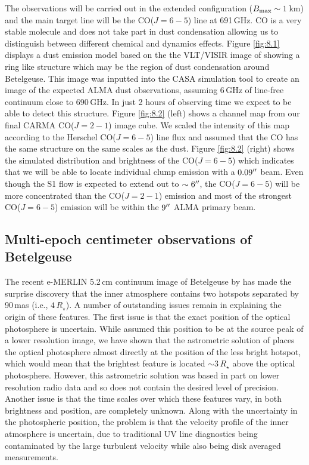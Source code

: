 The observations will be carried out in the extended configuration ($B_{\rm{max}} \sim 1\,$km) and the main target line will be the CO($J=6-5$) line at 691\,GHz. CO is a very stable molecule and does not take part in dust condensation allowing us to distinguish between different chemical and dynamics effects. Figure \ref{fig:8.1} displays a dust emission model based on the the VLT/VISIR image of \cite{kervella_2011} showing a ring like structure which may be the region of dust condensation around Betelgeuse. This image was inputted into the CASA simulation tool to create an image of the expected ALMA dust observations, assuming 6\,GHz of line-free continuum close to 690\,GHz. In just 2 hours of observing time we expect to be able to detect this structure. Figure \ref{fig:8.2} (left) shows a channel map from our final CARMA CO($J=2-1$) image cube. We scaled the intensity of this map according to the Herschel CO($J=6-5$)
line flux and assumed that the CO has the same structure on the same scales as the dust. Figure \ref{fig:8.2} (right) shows the simulated distribution and brightness of the CO($J=6-5$) which indicates that we will be able to locate individual clump emission with a $0.09^{\prime\prime}$ beam. Even though the S1 flow is expected to extend out to $\sim 6^{\prime\prime}$, the CO($J=6-5$) will be more concentrated than the CO($J=2-1$) emission and most of the strongest CO($J=6-5$) emission will be within the $9^{\prime\prime}$ ALMA primary beam.

\subsection{Multi-epoch centimeter observations of Betelgeuse}\label{sec:8.2.2}
The recent e-MERLIN 5.2\,cm continuum image of Betelgeuse by \cite{richards_2013} has made the surprise discovery that the inner atmosphere contains two hotspots separated by 90\,mas (i.e., $4\,R_{\star}$). A number of outstanding issues remain in explaining the origin of these features. The first issue is that the exact position of the optical photosphere is uncertain. While \cite{richards_2013} assumed this position to be at the source peak of a lower resolution image, we have shown that the astrometric solution of \cite{harper_2008} places the optical photosphere almost directly at the position of the less bright hotspot, which would mean that the brightest feature is located $\sim 3\,R_{\star}$ above the optical photosphere. However, this astrometric solution was based in part on lower resolution radio data and so does not contain the desired level of precision. Another issue is that the time scales over which these features vary, in both brightness and position, are completely unknown.  Along with the uncertainty in the photospheric position, the problem is that the velocity profile of the inner atmosphere is uncertain, due to traditional UV line diagnostics being contaminated by the large turbulent velocity while also being disk averaged measurements.

